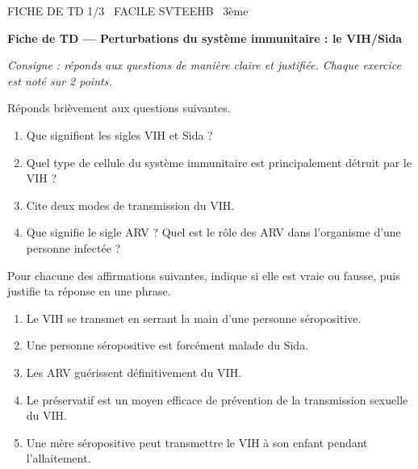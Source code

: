 \documentclass[11pt]{article}
\begin{document}
\begin{tcolorbox}[enhanced,colback=popink,colframe=popink,arc=10pt,boxrule=0pt,left=12pt,right=12pt,top=9pt,bottom=9pt]
{\color{white}\popxbold\small FICHE DE TD 1/3 \textbullet\ FACILE \hfill SVTEEHB \textbullet\ 3ème\par}
\end{tcolorbox}
\vspace{4pt}
\textbf{Fiche de TD — Perturbations du système immunitaire : le VIH/Sida}

\textit{Consigne : réponds aux questions de manière claire et justifiée. Chaque exercice est noté sur 2 points.}

\begin{exercice}
Réponds brièvement aux questions suivantes.
\begin{enumerate}
  \item Que signifient les sigles VIH et Sida ?
  \item Quel type de cellule du système immunitaire est principalement détruit par le VIH ?
  \item Cite deux modes de transmission du VIH.
  \item Que signifie le sigle ARV ? Quel est le rôle des ARV dans l'organisme d'une personne infectée ?
\end{enumerate}
\end{exercice}

\begin{exercice}
Pour chacune des affirmations suivantes, indique si elle est vraie ou fausse, puis justifie ta réponse en une phrase.
\begin{enumerate}
  \item Le VIH se transmet en serrant la main d'une personne séropositive.
  \item Une personne séropositive est forcément malade du Sida.
  \item Les ARV guérissent définitivement du VIH.
  \item Le préservatif est un moyen efficace de prévention de la transmission sexuelle du VIH.
  \item Une mère séropositive peut transmettre le VIH à son enfant pendant l'allaitement.
\end{enumerate}
\end{exercice}
\end{document}
